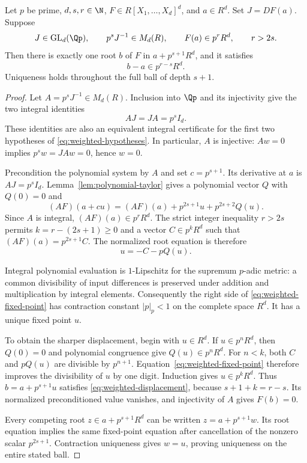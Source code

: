 \begin{theorem}\label{thm:weighted-lifting}
Let $p$ be prime, $d,s,r\in\N$, $F\in R[X_1,\ldots,X_d]^d$, and
$a\in R^d$. Set $J=DF(a)$. Suppose
\begin{equation}\label{eq:weighted-hypotheses}
 J\in\operatorname{GL}_d(\Qp),\qquad
 p^sJ^{-1}\in M_d(R),\qquad F(a)\in p^rR^d,\qquad r>2s.
\end{equation}
Then there is exactly one root $b$ of $F$ in $a+p^{s+1}R^d$, and it
satisfies
\begin{equation}\label{eq:weighted-displacement}
 b-a\in p^{r-s}R^d.
\end{equation}
Uniqueness holds throughout the full ball of depth $s+1$.
\end{theorem}

\begin{proof}
Let $A=p^sJ^{-1}\in M_d(R)$. Inclusion into $\Qp$ and its injectivity
give the two integral identities
\[
 AJ=JA=p^sI_d.
\]
These identities are also an equivalent integral certificate for the
first two hypotheses of \eqref{eq:weighted-hypotheses}. In particular,
$A$ is injective: $Aw=0$ implies $p^sw=JAw=0$, hence $w=0$.

Precondition the polynomial system by $A$ and set $c=p^{s+1}$.
Its derivative at $a$ is $AJ=p^sI_d$. Lemma~\ref{lem:polynomial-taylor}
gives a polynomial vector $Q$ with $Q(0)=0$ and
\[
 (AF)(a+cu)=(AF)(a)+p^{2s+1}u+p^{2s+2}Q(u).
\]
Since $A$ is integral, $(AF)(a)\in p^rR^d$. The strict integer inequality
$r>2s$ permits $k=r-(2s+1)\ge0$ and a vector $C\in p^kR^d$ such that
$(AF)(a)=p^{2s+1}C$. The normalized root equation is therefore
\begin{equation}\label{eq:weighted-fixed-point}
 u=-C-pQ(u).
\end{equation}

Integral polynomial evaluation is $1$-Lipschitz for the supremum
$p$-adic metric: a common divisibility of input differences is preserved
under addition and multiplication by integral elements. Consequently the
right side of \eqref{eq:weighted-fixed-point} has contraction constant
$|p|_p<1$ on the complete space $R^d$. It has a unique fixed point $u$.

To obtain the sharper displacement, begin with $u\in R^d$. If
$u\in p^nR^d$, then $Q(0)=0$ and polynomial congruence give
$Q(u)\in p^nR^d$. For $n<k$, both $C$ and $pQ(u)$ are divisible by
$p^{n+1}$. Equation~\eqref{eq:weighted-fixed-point} therefore improves
the divisibility of $u$ by one digit. Induction gives $u\in p^kR^d$.
Thus $b=a+p^{s+1}u$ satisfies \eqref{eq:weighted-displacement}, because
$s+1+k=r-s$. Its normalized preconditioned value vanishes, and injectivity
of $A$ gives $F(b)=0$.

Every competing root $z\in a+p^{s+1}R^d$ can be written
$z=a+p^{s+1}w$. Its root equation implies the same fixed-point
equation after cancellation of the nonzero scalar $p^{2s+1}$.
Contraction uniqueness gives $w=u$, proving uniqueness on the entire
stated ball.
\end{proof}

